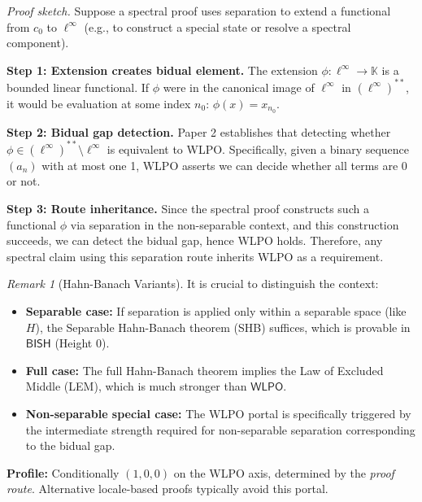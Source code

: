 \documentclass[11pt]{article}
\newcommand{\WLPO}{\mathsf{WLPO}}
\theoremstyle{plain}
\theoremstyle{definition}
\theoremstyle{remark}
\newtheorem{remark}[theorem]{Remark}
\newenvironment{prfsketch}{\noindent\textit{Proof sketch.} }{}
\newcommand{\BISH}{\mathsf{BISH}}
\begin{document}
\begin{prfsketch}
Suppose a spectral proof uses separation to extend a functional from $c_0$ to $\ell^\infty$ (e.g., to construct a special state or resolve a spectral component). 

\textbf{Step 1: Extension creates bidual element.}
The extension $\phi: \ell^\infty \to \mathbb{K}$ is a bounded linear functional. If $\phi$ were in the canonical image of $\ell^\infty$ in $(\ell^\infty)^{**}$, it would be evaluation at some index $n_0$: $\phi(x) = x_{n_0}$.

\textbf{Step 2: Bidual gap detection.}
Paper 2 establishes that detecting whether $\phi \in (\ell^\infty)^{**} \setminus \ell^\infty$ is equivalent to WLPO. 
Specifically, given a binary sequence $(a_n)$ with at most one 1, WLPO asserts we can decide whether all terms are 0 or not.

\textbf{Step 3: Route inheritance.}
Since the spectral proof constructs such a functional $\phi$ via separation in the non-separable context, 
and this construction succeeds, we can detect the bidual gap, hence WLPO holds.
Therefore, any spectral claim using this separation route inherits WLPO as a requirement.
\end{prfsketch}

\begin{remark}[Hahn-Banach Variants]
It is crucial to distinguish the context:
\begin{itemize}
\item \textbf{Separable case:} If separation is applied only within a separable space (like $H$), the Separable Hahn-Banach theorem (SHB) suffices, which is provable in $\BISH$ (Height 0). 
\item \textbf{Full case:} The full Hahn-Banach theorem implies the Law of Excluded Middle (LEM), which is much stronger than $\WLPO$.
\item \textbf{Non-separable special case:} The WLPO portal is specifically triggered by the intermediate strength required for non-separable separation corresponding to the bidual gap.
\end{itemize}
\end{remark}

\noindent\textbf{Profile:} Conditionally $(1,0,0)$ on the WLPO axis, determined by the \emph{proof route}. Alternative locale-based proofs typically avoid this portal.
\end{document}
